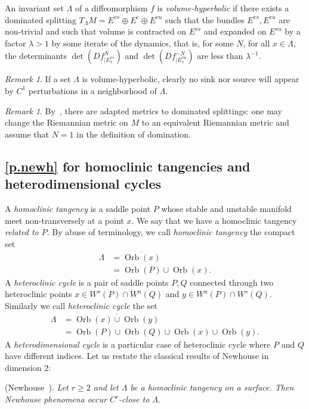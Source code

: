 \documentclass[11pt, a4paper]{amsart}
\theoremstyle{plain}
\theoremstyle{definition}
\theoremstyle{remark}
\newtheorem{remark}[proposition]{Remark}
\numberwithin{equation}{section}         %
\def\Orb{\operatorname{Orb}}
\begin{document}
An invariant set $\Lambda$ of a diffeomorphism $f$ is {\em volume-hyperbolic} if there exists a dominated splitting $T_\Lambda M= E^{vs}\oplus E^{c}\oplus E^{vu}$
such that the bundles $E^{vs},E^{vu}$ are non-trivial and such that volume is contracted on $E^{vs}$ and expanded on $E^{vu}$ by a factor $\lambda>1$ by some iterate of the dynamics, that is, for some  $N$, for all $x\in \Lambda$, the determinants $\det(Df^N_{|E^{vs}_x})$ and $\det(Df^{-N}_{|E^{vu}_x})$ are less than $\lambda^{-1}$.

\begin{remark}
If a set $\Lambda$ is volume-hyperbolic, clearly no sink nor source will appear by $C^1$ perturbations in a neighborhood of $\Lambda$.
\end{remark}

\begin{remark}
By~\cite{G1}, there are adapted metrics to dominated splittings: one may change the Riemannian metric on $M$ to an equivalent Riemannian metric and assume that $N=1$ in the definition of domination.
\end{remark}

\subsection{\cref{p.newh} for homoclinic tangencies and heterodimensional cycles}\label{s.turaevconj}
A {\em homoclinic tangency} is a saddle point $P$ whose stable and unstable manifold meet non-transversely at a point $x$. We say that we have a homoclinic tangency {\em related to $P$}. By abuse of terminology, we call {\em homoclinic tangency} the compact set 
\begin{align*}\Lambda&=\overline{\Orb(x)}\\
&=\Orb(P)\cup \Orb(x).
\end{align*}
 A {\em heteroclinic cycle} is a pair of saddle points $P,Q$ connected through two heteroclinic points $x\in W^s(P)\cap W^u(Q)$ and  $y\in W^u(P)\cap W^s(Q)$. Similarly we call {\em heteroclinic cycle} the set 
\begin{align*}
\Lambda&=\overline{\Orb(x)\cup \Orb(y)}\\
	&= \Orb(P)\cup \Orb(Q) \cup \Orb(x)\cup \Orb(y).
\end{align*}
A {\em heterodimensional cycle} is a particular case of heteroclinic cycle where $P$ and $Q$ have different indices.
Let us restate the classical results  of Newhouse in dimension $2$:
\medskip

 (Newhouse~\cite{N1,N2}). {\em Let $r\geq 2$ and let $\Lambda$ be a homoclinic tangency on a surface. Then Newhouse phenomena occur $C^r$-close to $\Lambda$.}
\medskip
\end{document}
